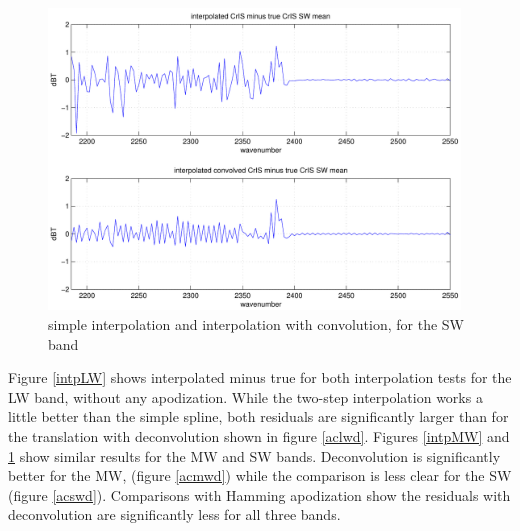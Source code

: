 \documentclass[12pt]{article}
\begin{document}
\begin{figure}
  \centering
  \includegraphics[height=8cm]{figures/airs_cris_intp_SW.pdf}
  \caption{simple interpolation and interpolation with convolution, 
    for the {\cris} SW band}
  \label{intpSW}
\end{figure}

Figure \ref{intpLW} shows interpolated {\cris} minus true {\cris}
for both interpolation tests for the LW band, without any
apodization.  While the two-step interpolation works a little better
than the simple spline, both residuals are significantly larger than
for the translation with deconvolution shown in figure \ref{aclwd}.
Figures \ref{intpMW} and \ref{intpSW} show similar results for the
MW and SW bands.  Deconvolution is significantly better for the MW,
(figure \ref{acmwd}) while the comparison is less clear for the SW
(figure \ref{acswd}).  Comparisons with Hamming apodization show the
residuals with deconvolution are significantly less for all three
bands.

\FloatBarrier


\end{document}
